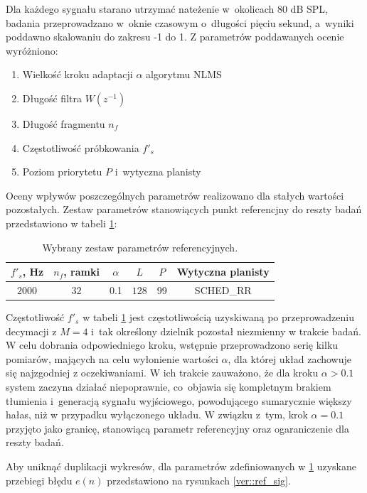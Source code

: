 Dla każdego sygnału starano utrzymać nateżenie w~okolicach 80 dB SPL, badania
przeprowadzano w~oknie czasowym o~długości pięciu sekund, a~wyniki poddawno
skalowaniu do zakresu -1 do 1. Z parametrów poddawanych ocenie wyróżniono:
\begin{enumerate}
    \item Wielkość kroku adaptacji $\alpha$ algorytmu NLMS 
    \item Długość filtra $W(z^{-1})$ 
    \item Długość fragmentu $n_f$
    \item Częstotliwość próbkowania $f'_s$
    \item Poziom priorytetu $P$ i~wytyczna planisty
\end{enumerate}

Oceny wpływów poszczególnych parametrów realizowano dla stałych wartości
pozostałych. Zestaw parametrów stanowiących punkt referencjny
do reszty badań przedstawiono w tabeli \ref{tab::ref}:

\begin{table}[H]
    \centering
    \begin{tabular}{|| c | c | c | c | c | c ||} 
        \hline
        $f'_s$, Hz & $n_f$, ramki & $\alpha$ & $L$ & $P$ & Wytyczna planisty \\ 
        \hline\hline
        $2000$ & $32$ & 0.1 & $128$ & 99 & SCHED\_RR \\
        \hline\hline
    \end{tabular}
    \caption{Wybrany zestaw parametrów referencyjnych.}
    \label{tab::ref}
\end{table}

Częstotliwość $f'_s$ w tabeli \ref{tab::ref} jest częstotliwością uzyskiwaną po
przeprowadzeniu decymacji z $M = 4$ i~tak określony dzielnik pozostał niezmienny
w trakcie badań. W celu dobrania odpowiedniego kroku, wstępnie przeprowadzono
serię kilku pomiarów, mających na celu wyłonienie wartości $\alpha$, dla której
układ zachowuje się najzgodniej z oczekiwaniami. W ich trakcie zauważono, że dla
kroku $\alpha > 0.1$ system zaczyna działać niepoprawnie, co~objawia się
kompletnym brakiem tłumienia i~generacją sygnału wyjściowego, powodującego
sumarycznie większy hałas, niż w przypadku wyłączonego układu. W związku z~tym,
krok $\alpha = 0.1$ przyjęto jako granicę, stanowiącą parametr referencyjny oraz
ogaraniczenie dla reszty badań. \par Aby uniknąć duplikacji wykresów, dla
parametrów zdefiniowanych w \ref{tab::ref} uzyskane przebiegi błędu $e(n)$
przedstawiono na rysunkach \ref{ver::ref_sig}.

